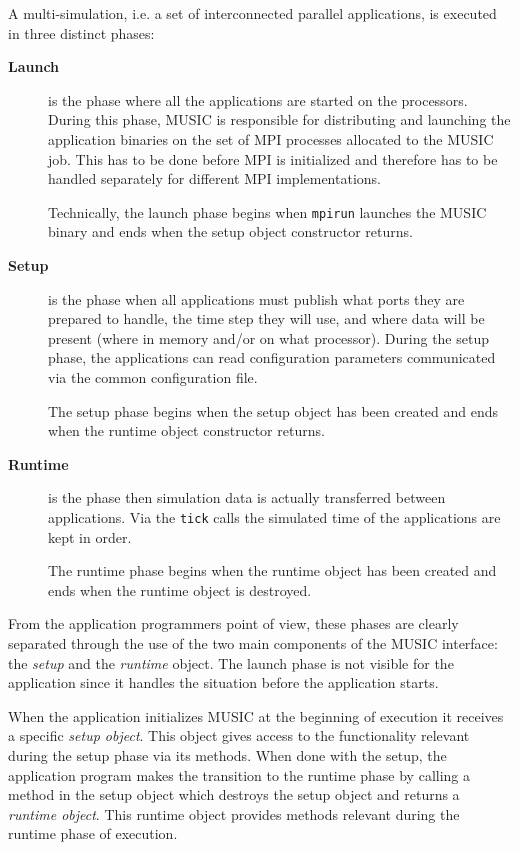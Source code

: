 \documentclass[a4paper]{report}
\begin{document}
A multi-simulation, i.e. a set of interconnected parallel
applications, is executed in three distinct phases:
\begin{description}
\item[\textbf{Launch}] is the phase where all the applications are
  started on the processors.  During this phase, MUSIC is responsible
  for distributing and launching the application binaries on the set
  of MPI processes allocated to the MUSIC job.  This has to be done
  before MPI is initialized and therefore has to be handled separately
  for different MPI implementations.

  Technically, the launch phase begins when \texttt{mpirun} launches
  the MUSIC binary and ends when the setup object constructor returns.

\item[\textbf{Setup}] is the phase when all applications must publish
  what ports they are prepared to handle, the time step they will use,
  and where data will be present (where in memory and/or on what
  processor).  During the setup phase, the applications can read
  configuration parameters communicated via the common configuration
  file.

  The setup phase begins when the setup object has been created and
  ends when the runtime object constructor returns.

\item[\textbf{Runtime}] is the phase then simulation data is actually
  transferred between applications.  Via the \texttt{tick} calls the
  simulated time of the applications are kept in order.

  The runtime phase begins when the runtime object has been created
  and ends when the runtime object is destroyed.
\end{description}

From the application programmers point of view, these phases are
clearly separated through the use of the two main components of the
MUSIC interface: the \emph{setup} and the \emph{runtime} object.  The
launch phase is not visible for the application since it handles the
situation before the application starts.

When the application initializes MUSIC at the beginning of execution
it receives a specific \emph{setup object}.  This object gives access
to the functionality relevant during the setup phase via its methods.
When done with the setup, the application program makes the transition
to the runtime phase by calling a method in the setup object which
destroys the setup object and returns a \emph{runtime object}.  This
runtime object provides methods relevant during the runtime phase of
execution.
\end{document}
